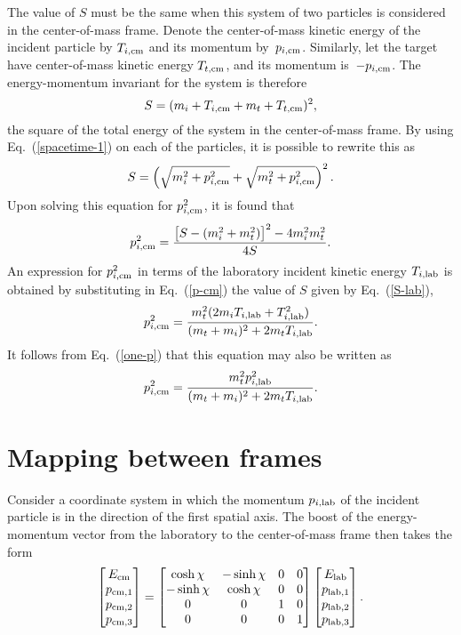 {The value of $S$ must be the same when this
system of two particles is considered in the center-of-mass
frame.  Denote the center-of-mass kinetic energy of
the incident particle by $T_{i,\textrm{cm}}$ and its momentum by~$p_{i,\textrm{cm}}$.
Similarly, let the target have center-of-mass kinetic energy $T_{t,\textrm{cm}}$, 
and its momentum is~$-p_{i,\textrm{cm}}$.  The energy-momentum invariant
for the system is therefore
\begin{equation}
  S = (m_i + T_{i,\textrm{cm}} + m_t + T_{t,\textrm{cm}})^2,
 \label{spacetime-cm}
\end{equation}
the square of the total energy of the system in the center-of-mass frame.
By using Eq.~(\ref{spacetime-1}) on each of the particles, it
is possible to rewrite this as
$$
  S = \left(
    \sqrt{m_i^2 + p_{i,\textrm{cm}}^2 } +
       \sqrt{m_t^2 + p_{i,\textrm{cm}}^2 }
   \right)^2.
$$
Upon solving this equation for $p_{i,\textrm{cm}}^2$, it is found that
\begin{equation}
  p_{i,\textrm{cm}}^2 = \frac{ \left[S - (m_i^2 + m_t^2)\right]^2 -
                 4 m_i^2 m_t^2 }
                {4 S }.
  \label{p-cm}
\end{equation}
An expression for $p_{i,\textrm{cm}}^2$ in terms of the
laboratory incident kinetic energy $T_{i,\textrm{lab}}$ is obtained by substituting
in Eq.~(\ref{p-cm}) the value of $S$ given by Eq.~(\ref{S-lab}),
\begin{equation}
  p_{i,\textrm{cm}}^2 = \frac{m_t^2( 2 m_i T_{i,\textrm{lab}} + T_{i,\textrm{lab}}^2)}
              {(m_t + m_i )^2 + 2m_t T_{i,\textrm{lab}}}.
  \label{p-cm-1}
\end{equation}
It follows from Eq.~(\ref{one-p}) that this equation may also
be written as
$$
  p_{i,\textrm{cm}}^2 = \frac{m_t^2 p_{i,\textrm{lab}}^2 }
                {(m_t + m_i )^2 + 2m_t T_{i,\textrm{lab}}}.
$$

\section{Mapping between frames}
Consider a coordinate system in which the momentum
$p_{i,\textrm{lab}}$ of the incident particle is in the direction of
the first spatial axis.  The boost of the energy-momentum
vector from
the laboratory to the center-of-mass frame then takes the
form
\begin{equation}
  \begin{bmatrix}
    E_{\text{cm}} \\
    p_{\textrm{cm},1} \\
    p_{\textrm{cm},2} \\
    p_{\textrm{cm},3}
  \end{bmatrix}
   =
    \begin{bmatrix}
     \cosh \chi & -\sinh \chi & 0 & 0 \\
     -\sinh \chi & \cosh \chi & 0 & 0 \\
     0  & 0 & 1 & 0 \\
     0  & 0 & 0 & 1
  \end{bmatrix}
  \begin{bmatrix}
    E_{\text{lab}} \\
    p_{\textrm{lab},1} \\
    p_{\textrm{lab},2} \\
    p_{\textrm{lab},3}
  \end{bmatrix}.
  \label{R-3}
\end{equation}

}
